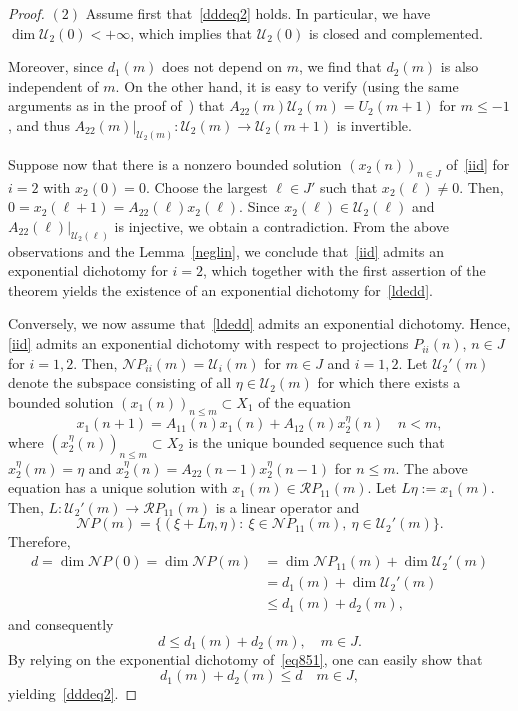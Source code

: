 \documentclass[11pt,reqno,a4paper]{amsart}
\theoremstyle{plain}
\numberwithin{equation}{section}
\theoremstyle{remark}
\begin{document}
\begin{proof}
$(2)$ Assume first that~\eqref{dddeq2} holds. In particular, we have $\dim \mathcal U_2(0)<+\infty$, which implies that $\mathcal U_2(0)$ is closed and complemented. 

Moreover, since $d_1(m)$ does not depend on $m$, we find that $d_2(m)$ is also independent of $m$. On the other hand, it is easy to verify (using the same arguments as in the proof of~\cite[Lemma 2]{DP}) that $A_{22}(m)\mathcal U_2(m)= U_2(m+1)$ for $m\le -1$, and thus $A_{22}(m)\rvert_{\mathcal U_2(m)}\colon \mathcal U_2(m)\to \mathcal U_2(m+1)$ is invertible.

Suppose now that there is a nonzero bounded solution $(x_2(n))_{n\in J}$ of~\eqref{iid} for $i=2$ with $x_2(0)=0$. Choose the largest $\ell \in J'$ such that $x_2(\ell)\neq 0$. Then, $0=x_2(\ell+1)=A_{22}(\ell)x_2(\ell)$. Since $x_2(\ell)\in \mathcal U_2(\ell)$ and $A_{22}(\ell)\rvert_{\mathcal U_2(\ell)}$ is injective, we obtain a contradiction.  From the above observations and the Lemma~\ref{neglin}, we conclude that~\eqref{iid} admits an exponential dichotomy for $i=2$, which together with the first assertion of the theorem yields the existence of an exponential dichotomy for~\eqref{ldedd}.

Conversely, we now assume that~\eqref{ldedd} admits an exponential dichotomy. Hence, \eqref{iid} admits an exponential dichotomy with respect to projections $P_{ii}(n)$, $n\in J$ for $i=1, 2$. Then, $\mathcal NP_{ii}(m)=\mathcal U_i(m)$ for $m\in J$ and $i=1, 2$. Let $\mathcal U_2'(m)$ denote the subspace consisting of all $\eta \in \mathcal U_2(m)$ for which there exists a bounded solution $(x_1(n))_{n\le m}\subset X_1$ of the equation
\[
x_1(n+1)=A_{11}(n)x_1(n)+A_{12}(n)x_2^\eta (n) \quad n<m, 
\]
where $(x_2^\eta(n))_{n\le m}\subset X_2$ is the unique bounded sequence such that $x_2^\eta(m)=\eta$ and $x_2^\eta(n)=A_{22}(n-1)x_2^\eta(n-1)$ for $n\le m$. The above equation has a unique solution with $x_1(m)\in \mathcal R P_{11}(m)$. Let $L\eta:=x_1(m)$. Then, $L\colon \mathcal U_2'(m)\to \mathcal RP_{11}(m)$ is a linear operator and 
\[
\mathcal N P(m)=\{(\xi+L\eta, \eta): \ \xi \in \mathcal NP_{11}(m), \ \eta \in \mathcal U_2'(m)\}.
\]
Therefore, 
\[
\begin{split}
d=\dim \mathcal NP(0)=\dim \mathcal NP(m) &= \dim  \mathcal NP_{11}(m)+\dim \mathcal U_2'(m)\\
&=d_1(m)+\dim \mathcal U_2'(m) \\
&\le d_1(m)+d_2(m),
\end{split}
\]
and consequently
\[
d\le d_1(m)+d_2(m), \quad m\in J.
\]
By relying on the exponential dichotomy of~\eqref{eq851}, one can easily show that 
\[
d_1(m)+d_2(m)\le d \quad m\in J,
\]
yielding~\eqref{dddeq2}.
\end{proof}
\end{document}
